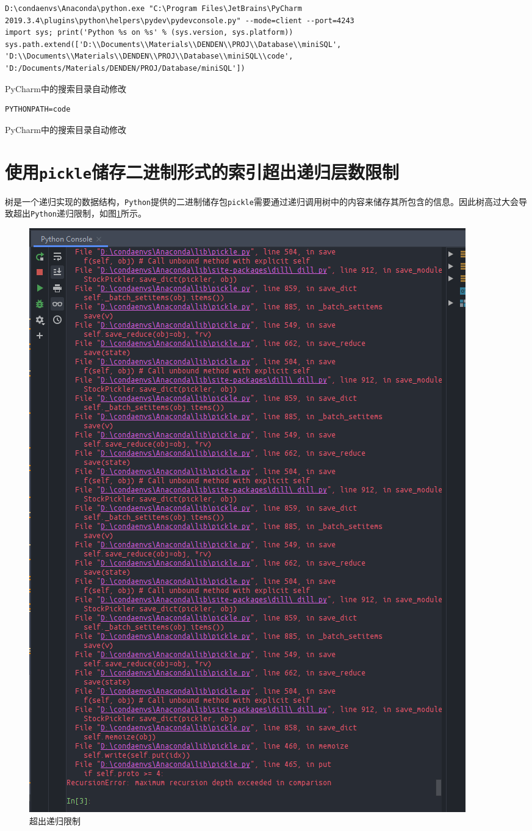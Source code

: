 \documentclass[UTF8]{ctexrep} %
\newenvironment{longlisting}{\captionsetup{type=listing}}{}
\begin{document}
\begin{longlisting}
    \begin{verbatim}
D:\condaenvs\Anaconda\python.exe "C:\Program Files\JetBrains\PyCharm 2019.3.4\plugins\python\helpers\pydev\pydevconsole.py" --mode=client --port=4243
import sys; print('Python %s on %s' % (sys.version, sys.platform))
sys.path.extend(['D:\\Documents\\Materials\\DENDEN\\PROJ\\Database\\miniSQL', 'D:\\Documents\\Materials\\DENDEN\\PROJ\\Database\\miniSQL\\code', 'D:/Documents/Materials/DENDEN/PROJ/Database/miniSQL']) 
    \end{verbatim}
    \caption{PyCharm中的搜索目录自动修改}
    \label{lst:path_append}
\end{longlisting}


\begin{longlisting}
    \begin{verbatim}
PYTHONPATH=code
    \end{verbatim}
    \caption{PyCharm中的搜索目录自动修改}
    \label{lst:manual_append}
\end{longlisting}

\section{使用\texttt{pickle}储存二进制形式的索引超出递归层数限制}
树是一个递归实现的数据结构，\texttt{Python}提供的二进制储存包\texttt{pickle}需要通过递归调用树中的内容来储存其所包含的信息。因此树高过大会导致超出\texttt{Python}递归限制，如图\ref{fig:recursion_limit}所示。

\begin{figure}[H]
    \centering
    \includegraphics[width=0.4\linewidth]{figure/recursion_limit.png}
    \caption{超出递归限制}
    \label{fig:recursion_limit}
\end{figure}
\end{document}
